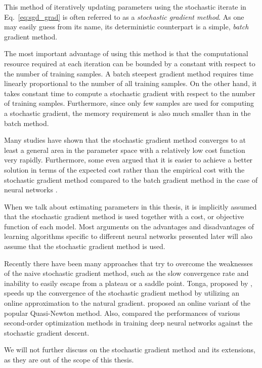 \documentclass[dissertation,nocontribution]{aaltoseries}
\begin{document}
This method of iteratively updating parameters using the
stochastic iterate in Eq.~\eqref{eq:sgd_grad} is often
referred to as a \textit{stochastic gradient method}. As one
may easily guess from its name, its deterministic
counterpart is a simple, \textit{batch} gradient method.

The most important advantage of using this method is that the
computational resource required at each iteration can be bounded
by a constant with respect to the number of training samples. A
batch steepest gradient method requires time linearly
proportional to the number of all training samples.  On the other
hand, it takes constant time to compute a stochastic gradient
with respect to the number of training samples. Furthermore,
since only few samples are used for computing a stochastic
gradient, the memory requirement is also much smaller than
in the batch method.

Many studies \citep[see, e.g.,][]{Bottou2008,Bottou2004}
have shown that the stochastic gradient method converges to
at least a general area in the parameter space with a
relatively low cost function very rapidly. Furthermore, some
even argued that it is easier to achieve a better solution
in terms of the expected cost rather than the empirical cost
with the stochastic gradient method compared to the batch
gradient method in the case of neural networks
\citep{Lecun1998a}.

When we talk about estimating parameters in this thesis, it is
implicitly assumed that the stochastic gradient method is used
together with a cost, or objective function of each model. Most
arguments on the advantages and disadvantages of learning
algorithms specific to different neural networks presented later
will also assume that the stochastic gradient method is used.

Recently there have been many approaches that try to
overcome the weaknesses of the naive stochastic gradient
method, such as the slow convergence rate and inability to
easily escape from a plateau or a saddle point.  Tonga,
proposed by \citet{Roux2008a}, speeds up the convergence of
the stochastic gradient method by utilizing an online
approximation to the natural gradient.
\citet{Schraudolph2007} proposed an online variant of the
popular Quasi-Newton method.
Also, \citet{Le2011} compared the performances of various
second-order optimization methods in training deep neural
networks against the stochastic gradient descent.

We will not further discuss on the stochastic
gradient method and its extensions, as they are out of the
scope of this thesis.
\end{document}
